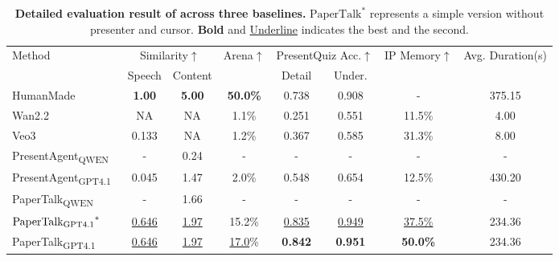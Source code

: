 \begin{table}[t]
  \centering
  \setlength{\tabcolsep}{4pt}
  \footnotesize
  \caption{\textbf{Detailed evaluation result of {\bench} across three baselines.} $\text{PaperTalk}^{*}$ represents a simple version without presenter and cursor. \textbf{Bold} and \underline{Underline} indicates the best and the second.}
  \label{tab:main_result}

  \begin{tabular*}{\linewidth}{l c c c c c c c}

    \toprule
    \multirow{2}{*}{Method} &
    \multicolumn{2}{c}{Similarity$\uparrow$} &
    \multirow{2}{*}{Arena$\uparrow$} &
    \multicolumn{2}{c}{PresentQuiz Acc.$\uparrow$} &
    \multirow{2}{*}{IP Memory$\uparrow$} &
    \multirow{2}{*}{Avg. Duration(s)}\\
    \cmidrule(lr){2-3}\cmidrule(lr){5-6}
    & Speech & Content & & Detail & Under.\\
    \midrule
    HumanMade & \textbf{1.00} & \textbf{5.00}  & \textbf{50.0\%}  & 0.738  & 0.908  & - & 375.15\\
    \midrule
    \rowcolor{gray!20} Wan2.2~\cite{wan} & NA & NA & 1.1\% & 0.251 & 0.551 & 11.5\% & 4.00\\
    \rowcolor{gray!20} Veo3~\cite{deepmind2025veo3} & 0.133 & NA & 1.2\% & 0.367 & 0.585 & 31.3\% & 8.00\\
    PresentAgent\textsubscript{QWEN}~\cite{shi2025presentagent} & - & 0.24 & - & - & - & - & - \\
    PresentAgent\textsubscript{GPT4.1}~\cite{shi2025presentagent} & 0.045 & 1.47 & 2.0\% & 0.548 & 0.654 & 12.5\% & 430.20\\
    \midrule
    PaperTalk\textsubscript{QWEN} & - & 1.66 & - & - & - & - & - \\
    $\text{PaperTalk\textsubscript{GPT4.1}}^{*}$ & \underline{0.646} & \underline{1.97} & 15.2\% & \underline{0.835}  & \underline{0.949} & \underline{37.5\%} & 234.36 \\
    PaperTalk\textsubscript{GPT4.1} & \underline{0.646} & \underline{1.97} & \underline{17.0}\% & \textbf{0.842}  & \textbf{0.951} & \textbf{50.0\%} & 234.36\\
    \bottomrule
  \end{tabular*}
\end{table}
\vspace{-0.4\baselineskip}   


\vspace{-0.4\baselineskip} 
